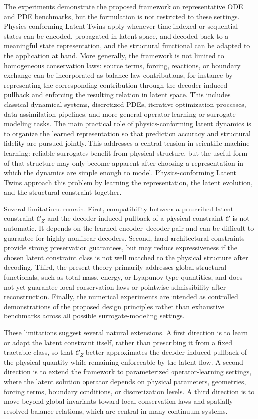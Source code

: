 \documentclass[a4paper,fleqn]{cas-sc}
\theoremstyle{thmstyleone}%
\theoremstyle{thmstyletwo}%
\theoremstyle{thmstylethree}%
\begin{document}
The experiments demonstrate the proposed framework on representative ODE and PDE benchmarks, but the formulation is not restricted to these settings. Physics-conforming Latent Twins apply whenever time-indexed or sequential states can be encoded, propagated in latent space, and decoded back to a meaningful state representation, and the structural functional can be adapted to the application at hand. More generally, the framework is not limited to homogeneous conservation laws: source terms, forcing, reactions, or boundary exchange can be incorporated as balance-law contributions, for instance by representing the corresponding contribution through the decoder-induced pullback and enforcing the resulting relation in latent space. This includes classical dynamical systems, discretized PDEs, iterative optimization processes, data-assimilation pipelines, and more general operator-learning or surrogate-modeling tasks. The main practical role of physics-conforming latent dynamics is to organize the learned representation so that prediction accuracy and structural fidelity are pursued jointly. This addresses a central tension in scientific machine learning: reliable surrogates benefit from physical structure, but the useful form of that structure may only become apparent after choosing a representation in which the dynamics are simple enough to model. Physics-conforming Latent Twins approach this problem by learning the representation, the latent evolution, and the structural constraint together.

Several limitations remain. First, compatibility between a prescribed latent constraint $\mathcal C_Z$ and the decoder-induced pullback of a physical constraint $\mathcal C$ is not automatic. It depends on the learned encoder--decoder pair and can be difficult to guarantee for highly nonlinear decoders. Second, hard architectural constraints provide strong preservation guarantees, but may reduce expressiveness if the chosen latent constraint class is not well matched to the physical structure after decoding. Third, the present theory primarily addresses global structural functionals, such as total mass, energy, or Lyapunov-type quantities, and does not yet guarantee local conservation laws or pointwise admissibility after reconstruction. Finally, the numerical experiments are intended as controlled demonstrations of the proposed design principles rather than exhaustive benchmarks across all possible surrogate-modeling settings.

These limitations suggest several natural extensions. A first direction is to learn or adapt the latent constraint itself, rather than prescribing it from a fixed tractable class, so that $\mathcal C_Z$ better approximates the decoder-induced pullback of the physical quantity while remaining enforceable by the latent flow. A second direction is to extend the framework to parameterized operator-learning settings, where the latent solution operator depends on physical parameters, geometries, forcing terms, boundary conditions, or discretization levels. A third direction is to move beyond global invariants toward local conservation laws and spatially resolved balance relations, which are central in many continuum systems.
\end{document}
